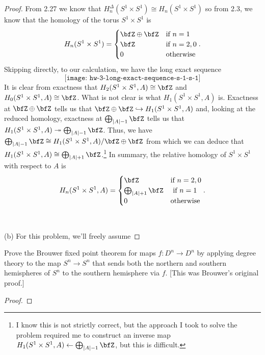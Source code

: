 \begin{proof}
From 2.27 we know that $H_n^\Delta(S^1\times S^1)\cong H_n(S^1\times S^1)$
so from 2.3, we know that the homology of the torus $S^1\times S^1$ is
\begin{equation}
\label{eq:homology-of-s-1-s-1}
H_n(S^1\times S^1)=
\begin{cases}
\bfZ\oplus\bfZ&\text{if $n=1$}\\
\bfZ&\text{if $n=2,0$}\\
0&\text{otherwise}
\end{cases}.
\end{equation}
Skipping directly, to our calculation, we have the long exact sequence
\begin{equation}
  \label{eq:long-exact-sequence-s-1-s-1}
\texttt{[image: hw-3-long-exact-sequence-s-1-s-1]}
\end{equation}
It is clear from exactness that $H_2(S^1\times S^1,A)\cong\bfZ$ and
$H_0(S^1\times S^1,A)\cong\bfZ$. What is not clear is what $H_1(S^1\times
S^1,A)$ is. Exactness at $\bfZ\oplus\bfZ$ tells us that
$\bfZ\oplus\bfZ\hookrightarrow H_1(S^1\times S^1,A)$ and, looking at the
reduced homology, exactness at $\bigoplus_{|A|-1}\bfZ$ tells us that
$H_1(S^1\times S^1,A)\twoheadrightarrow\bigoplus_{|A|-1}\bfZ$. Thus,
we have $\bigoplus_{|A|-1}\bfZ\cong H_1(S^1\times S^1,A)/\bfZ\oplus\bfZ$
from which we can deduce that $H_1(S^1\times
S^1,A)\cong\bigoplus_{|A|+1}\bfZ$.\footnote{I know this is not strictly
  correct, but the approach I took to solve the problem required me to
  construct an inverse map $H_1(S^1\times
  S^1,A)\leftarrow\bigoplus_{|A|-1}\bfZ$, but this is difficult.} In summary, the relative homology of
$S^1\times S^1$ with respect to $A$ is
\begin{equation}
  \label{eq:homology-of-s-1-s-1-a}
H_n(S^1\times S^1,A)=
\begin{cases}
\bfZ&\text{if $n=2,0$}\\
\bigoplus_{|A|+1}\bfZ&\text{ if $n=1$}\\
0&\text{otherwise}
\end{cases}.
\end{equation}
\\\\
(b) For this problem, we'll freely assume
\end{proof}
\newpage

\begin{problem}[Hatcher {\S}2.2, Ex.\@ 1]
Prove the Brouwer fixed point theorem for maps $f\colon D^n\to D^n$ by applying
degree theory to the map $S^n\to S^n$ that sends both the northern and
southern hemispheres of $S^n$ to the southern hemisphere via $f$. [This was
Brouwer’s original proof.]
\end{problem}
\begin{proof}

\end{proof}
\newpage

